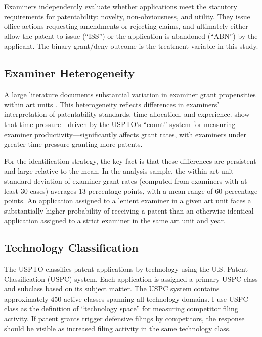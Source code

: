 \documentclass[12pt]{article}
\begin{document}
Examiners independently evaluate whether applications meet the statutory requirements for patentability: novelty, non-obviousness, and utility. They issue office actions requesting amendments or rejecting claims, and ultimately either allow the patent to issue (``ISS'') or the application is abandoned (``ABN'') by the applicant. The binary grant/deny outcome is the treatment variable in this study.

\subsection{Examiner Heterogeneity}

A large literature documents substantial variation in examiner grant propensities within art units \citep{lemley2001, frakes2017, righi2023}. This heterogeneity reflects differences in examiners' interpretation of patentability standards, time allocation, and experience. \citet{frakes2017} show that time pressure---driven by the USPTO's ``count'' system for measuring examiner productivity---significantly affects grant rates, with examiners under greater time pressure granting more patents.

For the identification strategy, the key fact is that these differences are persistent and large relative to the mean. In the analysis sample, the within-art-unit standard deviation of examiner grant rates (computed from examiners with at least 30 cases) averages 13 percentage points, with a mean range of 60 percentage points. An application assigned to a lenient examiner in a given art unit faces a substantially higher probability of receiving a patent than an otherwise identical application assigned to a strict examiner in the same art unit and year.

\subsection{Technology Classification}

The USPTO classifies patent applications by technology using the U.S. Patent Classification (USPC) system. Each application is assigned a primary USPC class and subclass based on its subject matter. The USPC system contains approximately 450 active classes spanning all technology domains. I use USPC class as the definition of ``technology space'' for measuring competitor filing activity. If patent grants trigger defensive filings by competitors, the response should be visible as increased filing activity in the same technology class.
\end{document}
